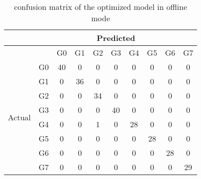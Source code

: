 \begin{longtable}{cccccccccc}
\caption{confusion matrix of the optimized model in offline mode}
\label{tab:my-table}\\
\cline{2-10}
                        & \multicolumn{9}{c}{Predicted}              \\ \cline{2-10} 
\endfirsthead
%
\endhead
%
                        &    & G0 & G1 & G2 & G3 & G4 & G5 & G6 & G7 \\ \hline
\multirow{8}{*}{Actual} & G0 & 40 & 0  & 0  & 0  & 0  & 0  & 0  & 0  \\ \cline{2-2}
                        & G1 & 0  & 36 & 0  & 0  & 0  & 0  & 0  & 0  \\ \cline{2-2}
                        & G2 & 0  & 0  & 34 & 0  & 0  & 0  & 0  & 0  \\ \cline{2-2}
                        & G3 & 0  & 0  & 0  & 40 & 0  & 0  & 0  & 0  \\ \cline{2-2}
                        & G4 & 0  & 0  & 1  & 0  & 28 & 0  & 0  & 0  \\ \cline{2-2}
                        & G5 & 0  & 0  & 0  & 0  & 0  & 28 & 0  & 0  \\ \cline{2-2}
                        & G6 & 0  & 0  & 0  & 0  & 0  & 0  & 28 & 0  \\ \cline{2-2}
                        & G7 & 0  & 0  & 0  & 0  & 0  & 0  & 0  & 29 \\ \hline
\end{longtable}
